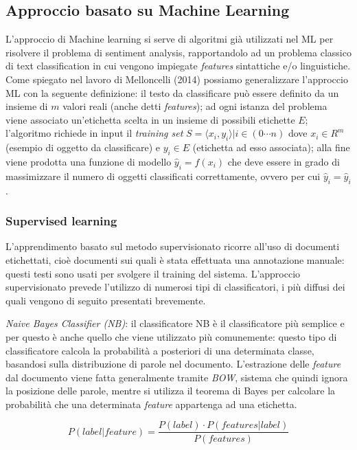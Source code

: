 \documentclass[a4paper,12pt,openright,twoside]{report}
\theoremstyle{definition}
\begin{document}
\subsection{Approccio basato su Machine Learning}
L'approccio di Machine learning si serve di algoritmi già utilizzati nel ML per risolvere il problema
di sentiment analysis, rapportandolo ad un problema classico di text classification 
in cui vengono impiegate
\emph{features} sintattiche e/o linguistiche.
Come spiegato nel lavoro di Melloncelli (2014) %
possiamo generalizzare l'approccio ML con la seguente
definizione: il testo da classificare può essere definito da un insieme
di $m$ valori reali (anche detti \emph{features}); ad ogni istanza del problema viene associato
un'etichetta scelta in un insieme di possibili etichette $E$; l’algoritmo richiede in input il
\emph{training set} $S = {\langle x_i , y_i\rangle | i \in (0 \cdots n)}$ dove $x_i \in R^m$
(esempio di oggetto da classificare)
e $y_i \in E$ (etichetta ad esso associata); alla fine viene prodotta una funzione di modello 
$\hat{y}_i = f(x_i)$ che deve essere in grado di massimizzare il numero di oggetti classificati
correttamente, ovvero per cui $\hat{y}_i = \hat{y}_i$.

\subsubsection{Supervised learning}
L’apprendimento basato sul metodo supervisionato ricorre all'uso di documenti etichettati,
cioè documenti sui quali è stata effettuata una annotazione manuale: questi 
testi sono usati
per svolgere il training del sistema. L'approccio supervisionato prevede l'utilizzo
di numerosi tipi di classificatori, i più diffusi dei quali vengono di seguito
presentati brevemente.

\emph{Naive Bayes Classifier (NB)}: il classificatore NB è il classificatore più semplice
e per questo è anche quello che viene utilizzato più comunemente: questo tipo di classificatore calcola
la probabilità a posteriori di una determinata classe, basandosi sulla distribuzione
di parole nel documento. L'estrazione delle \emph{feature} dal documento viene fatta
generalmente 
tramite \emph{BOW}, sistema che quindi ignora la posizione delle parole, mentre si utilizza il
teorema di Bayes per calcolare la probabilità che una determinata \emph{feature}
appartenga ad una etichetta.

\begin{equation}
	P(label|feature)=\frac{P(label)\cdot{}P(features|label)}{P(features)}
	\label{Bayes}
\end{equation}
\end{document}

